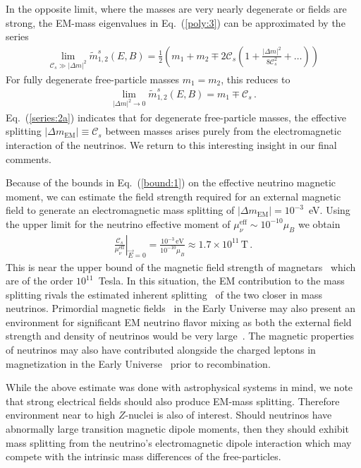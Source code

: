 \documentclass[addchapnum]{ws-rv961x669} %
\newcommand{\req}[1]{Eq.~(\ref{#1})}
\begin{document}
In the opposite limit, where the masses are very nearly degenerate or fields are strong, the EM-mass eigenvalues in \req{poly:3} can be approximated by the series
\begin{align}
\label{series:2}
\lim_{\mathcal{C}_{s}\gg|\Delta m|^{2}}\widetilde m_{1,2}^{s}(E,B)=\frac{1}{2}\left(m_{1}+m_{2}\mp2\mathcal{C}_{s}\left(1+\frac{|\Delta m|^{2}}{8\mathcal{C}_{s}^{2}}+\ldots\right)\right)
\end{align}
For fully degenerate free-particle masses $m_{1}=m_{2}$, this reduces to
\begin{align}
\label{series:2a}
\lim_{|\Delta m|^{2}\to0}\widetilde m_{1,2}^{s}(E,B)=m_{1}\mp\mathcal{C}_{s}\,.
\end{align}
\req{series:2a} indicates that for degenerate free-particle masses, the effective splitting $|\Delta m_\mathrm{EM}|\equiv\mathcal{C}_{s}$ between masses arises purely from the electromagnetic interaction of the neutrinos. We return to this interesting insight in our final comments.

Because of the bounds in \req{bound:1} on the effective neutrino magnetic moment, we can estimate the field strength required for an external magnetic field to generate an electromagnetic mass splitting of $|\Delta m_\mathrm{EM}|=10^{-3}$~eV. Using the upper limit for the neutrino effective moment of $\mu_{\nu}^\mathrm{eff}\sim10^{-10}\mu_{B}$ we obtain
\begin{align}
\label{estimate:1}
\left.\frac{\mathcal{C}_{s}}{\mu_{\nu}^\mathrm{eff}}\right\rvert_{\vec{E}=0}=\frac{10^{-3}\,\mathrm{eV}}{10^{-10}\mu_{B}}\approx1.7\times10^{11}\,\mathrm{T}\,.
\end{align}
This is near the upper bound of the magnetic field strength of magnetars~\cite{Kaspi:2017fwg} which are of the order $10^{11}$~Tesla. In this situation, the EM contribution to the mass splitting rivals the estimated inherent splitting~\cite{ParticleDataGroup:2022pth} of the two closer in mass neutrinos. Primordial magnetic fields~\cite{Grasso:2000wj} in the Early Universe may also present an environment for significant EM neutrino flavor mixing as both the external field strength and density of neutrinos would be very large~\cite{Rafelski:2023emw}. The magnetic properties of neutrinos may also have contributed alongside the charged leptons in magnetization in the Early Universe~\cite{Steinmetz:2023nsc} prior to recombination. 

While the above estimate was done with astrophysical systems in mind, we note that strong electrical fields should also produce EM-mass splitting. Therefore environment near to high $Z$-nuclei is also of interest. Should neutrinos have abnormally large transition magnetic dipole moments, then they should exhibit mass splitting from the neutrino's electromagnetic dipole interaction which may compete with the intrinsic mass differences of the free-particles.
\end{document}
